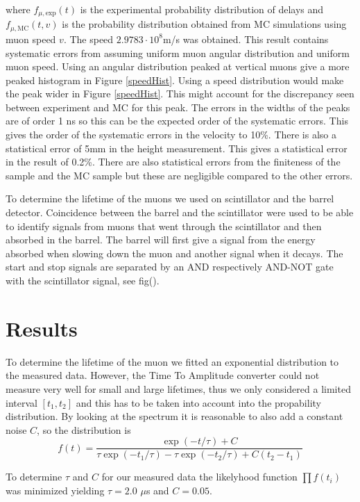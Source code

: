 \documentclass[10pt,twocolumn]{article}
\begin{document}
where $f_{\mu,\mathrm{exp}}(t)$ is the experimental probability distribution of delays and $f_{\mu,\mathrm{MC}}(t,v)$ is the probability distribution obtained from MC simulations using muon speed $v$. The speed $2.9783\cdot10^8$m/s was obtained. This result contains systematic errors from assuming uniform muon angular distribution and uniform muon speed. Using an angular distribution peaked at vertical muons give a more peaked histogram in Figure \ref{speedHist}. Using a speed distribution would make the peak wider in Figure \ref{speedHist}. This might account for the discrepancy seen between experiment and MC for this peak. The errors in the widths of the peaks are of order 1 ns so this can be the expected order of the systematic errors. This gives the order of the systematic errors in the velocity to 10\%. There is also a statistical error of 5mm in the height measurement. This gives a statistical error in the result of 0.2\%. There are also statistical errors from the finiteness of the sample and the MC sample but these are negligible compared to the other errors.

To determine the lifetime of the muons we used on scintillator and the barrel detector. Coincidence between the barrel and the scintillator were used to be able to identify signals from muons that went through the scintillator and then absorbed in the barrel. The barrel will first give a signal from the energy absorbed when slowing down the muon and another signal when it decays. The start and stop signals are separated by an AND respectively AND-NOT gate with the scintillator signal, see fig().

\section{Results}
To determine the lifetime of the muon we fitted an exponential distribution to the measured data. However, the Time To Amplitude converter could not measure very well for small and large lifetimes, thus we only considered a limited interval $[t_1,t_2]$ and this has to be taken into account into the propability distribution. By looking at the spectrum it is reasonable to also add a constant noise $C$, so the distribution is
\begin{equation}
f(t)=\frac{\exp{(-t/\tau)}+C}{\tau\exp{(-t_1/\tau)}-\tau\exp{(-t_2/\tau)}+C(t_2-t_1)}\label{pdf}
\end{equation}

To determine $\tau$ and $C$ for our measured data the likelyhood function $\prod f(t_i)$ was minimized yielding $\tau=2.0$ $\mu$s and $C=0.05$. \newline
\end{document}
